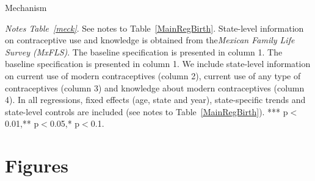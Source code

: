 \documentclass[a4paper, 11pt]{article}
\begin{document}
\begin{spacing}{2}
\begin{table}[H]\centering\caption{Mechanism}\label{meck}
\begin{threeparttable}\centering
\begin{subtable}{\textwidth}\centering{}\label{meckFertility}
{\footnotesize }
\end{subtable}
\begin{subtable}{\textwidth}\centering{}\label{meckMMR}
{\footnotesize  }
\end{subtable}
\begin{tablenotes}
\footnotesize
\item \textit{Notes Table~\ref*{meck}}. See notes to Table~\ref{MainRegBirth}. State-level information on contraceptive use and knowledge is obtained from the\textit{Mexican Family Life Survey (MxFLS)}. The baseline specification is presented in column 1. The baseline specification is presented in column 1. We include state-level information on current use of modern contraceptives (column 2), current use of any type of contraceptives (column 3) and knowledge about modern contraceptives (column 4). In all regressions, fixed effects (age, state and year), state-specific trends and state-level controls are included (see notes to Table~\ref{MainRegBirth}). *** p$<$0.01,** p$<$0.05,* p$<$0.1.
\end{tablenotes}
\end{threeparttable}
\end{table}
\restoregeometry

\section{Figures}


\end{spacing}
\end{document}
